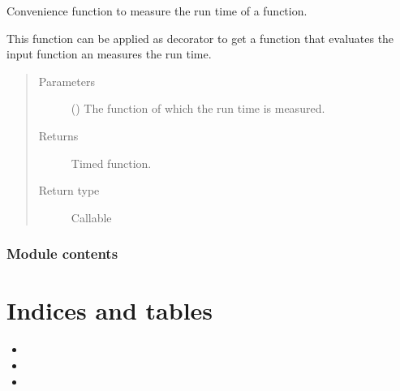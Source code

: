 \documentclass[letterpaper,10pt,english]{sphinxmanual}
\begin{document}

\begin{fulllineitems}
\label{\detokenize{qsim:qsim.util.timeit}}
Convenience function to measure the run time of a function.

This function can be applied as decorator to get a function that evaluates
the input function an measures the run time.
\begin{quote}\begin{description}
\item[{Parameters}] \leavevmode
{} () \textendash{} The function of which the run time is measured.

\item[{Returns}] \leavevmode
{} \textendash{} Timed function.

\item[{Return type}] \leavevmode
Callable

\end{description}\end{quote}

\end{fulllineitems}



\subsection{Module contents}
\label{\detokenize{qsim:module-qsim}}\label{\detokenize{qsim:module-contents}}

\chapter{Indices and tables}
\label{\detokenize{index:indices-and-tables}}\begin{itemize}
\item {} 

\item {} 

\item {} 

\end{itemize}
\end{document}
